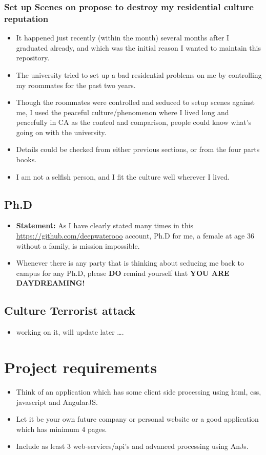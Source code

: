 \documentclass[9pt,b5paper]{article}
\begin{document}
\subsubsection{Set up Scenes on propose to destroy my residential culture reputation}
\label{sec-12-3-11}
\begin{itemize}
\item It happened just recently (within the month) several months after I graduated already, and which was the initial reason I wanted to maintain this repository.
\item The university tried to set up a bad residential problems on me by controlling my roommates for the past two years.
\item Though the roommates were controlled and seduced to setup scenes against me, I used the peaceful culture/phenomenon where I lived long and peacefully in CA as the control and comparison, people could know what's going on with the university.
\item Details could be checked from either previous sections, or from the four parts books.
\item I am not a selfish person, and I fit the culture well wherever I lived.
\end{itemize}

\subsection{Ph.D}
\label{sec-12-4}
\begin{itemize}
\item \textbf{Statement:} As I have clearly stated many times in this \url{https://github.com/deepwaterooo} account, Ph.D for me, a female at age 36 without a family, is mission impossible.
\item Whenever there is any party that is thinking about seducing me back to campus for any Ph.D, please \textbf{DO} remind yourself that \textbf{YOU ARE DAYDREAMING!}
\end{itemize}
\subsection{Culture Terrorist attack}
\label{sec-12-5}
\begin{itemize}
\item working on it, will update later \ldots{}.
\end{itemize}


\section{Project requirements}
\label{sec-13}
\begin{itemize}
\item Think of an application which has some client side processing using html, css, javascript and AngularJS.
\item Let it be your own future company or personal website or a good application which has minimum 4 pages.
\item Include as least 3 web-services/api's and advanced processing using AnJs.
\end{itemize}
\end{document}
